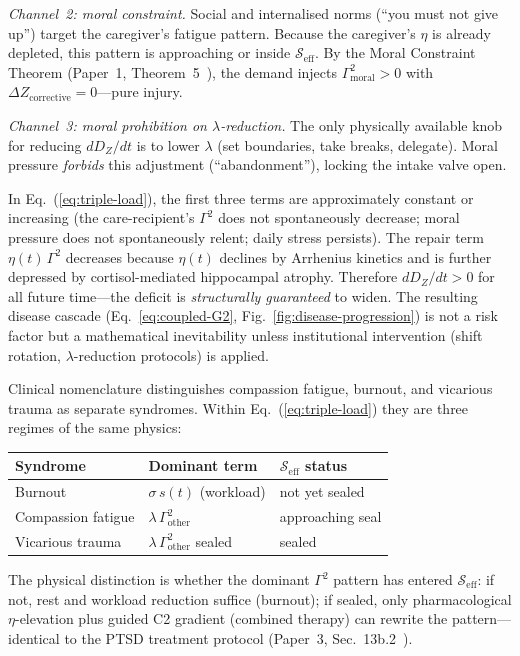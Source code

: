\documentclass[aps,pre,twocolumn,superscriptaddress,floatfix]{revtex4-2}
\begin{document}
\emph{Channel~2: moral constraint.}
Social and internalised norms
(``you must not give up'') target the caregiver's
fatigue pattern.
Because the caregiver's $\eta$ is already depleted,
this pattern is approaching or inside
$\mathcal{S}_{\text{eff}}$.
By the Moral Constraint Theorem
(Paper~1, Theorem~5~\cite{Paper1}),
the demand injects $\Gamma_{\text{moral}}^2>0$
with $\Delta Z_{\text{corrective}}=0$---pure injury.

\emph{Channel~3: moral prohibition on
$\lambda$-reduction.}
The only physically available knob for reducing
$dD_Z/dt$ is to lower $\lambda$ (set boundaries,
take breaks, delegate).
Moral pressure \emph{forbids} this adjustment
(``abandonment''), locking the intake valve open.

\begin{remark}
\label{rem:caregiver-inevitable}
In Eq.~(\ref{eq:triple-load}), the first three
terms are approximately constant or increasing
(the care-recipient's $\Gamma^2$ does not
spontaneously decrease; moral pressure does not
spontaneously relent; daily stress persists).
The repair term $\eta(t)\,\Gamma^2$ decreases
because $\eta(t)$ declines by Arrhenius kinetics
and is further depressed by cortisol-mediated
hippocampal atrophy.
Therefore $dD_Z/dt > 0$ for all future time---the
deficit is \emph{structurally guaranteed} to widen.
The resulting disease cascade
(Eq.~\ref{eq:coupled-G2},
Fig.~\ref{fig:disease-progression})
is not a risk factor but a mathematical
inevitability unless institutional intervention
(shift rotation, $\lambda$-reduction protocols)
is applied.
\end{remark}

\begin{remark}
\label{rem:fatigue-taxonomy}
Clinical nomenclature distinguishes compassion
fatigue, burnout, and vicarious trauma as separate
syndromes.
Within Eq.~(\ref{eq:triple-load}) they are three
regimes of the same physics:
\begin{center}
\begin{tabular}{lll}
\toprule
Syndrome & Dominant term &
  $\mathcal{S}_{\text{eff}}$ status \\
\midrule
Burnout & $\sigma\,s(t)$ (workload) &
  not yet sealed \\
Compassion fatigue &
  $\lambda\,\Gamma_{\text{other}}^2$ &
  approaching seal \\
Vicarious trauma &
  $\lambda\,\Gamma_{\text{other}}^2$ sealed &
  sealed \\
\bottomrule
\end{tabular}
\end{center}
The physical distinction is whether the dominant
$\Gamma^2$ pattern has entered
$\mathcal{S}_{\text{eff}}$:
if not, rest and workload reduction suffice
(burnout); if sealed, only pharmacological
$\eta$-elevation plus guided C2 gradient
(combined therapy) can rewrite the pattern---
identical to the PTSD treatment protocol
(Paper~3, Sec.~13b.2~\cite{Paper3}).
\end{remark}
\end{document}
